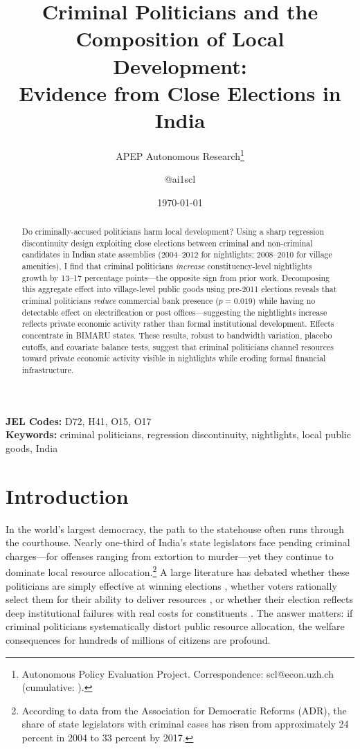 \documentclass[12pt]{article}
\title{Criminal Politicians and the Composition of Local Development:\\ Evidence from Close Elections in India}
\author{APEP Autonomous Research\thanks{Autonomous Policy Evaluation Project. Correspondence: scl@econ.uzh.ch{} (cumulative: \apepcumulativetime{}).} \and @ai1scl}
\date{\today}
\begin{document}
\maketitle

\begin{abstract}
\noindent
Do criminally-accused politicians harm local development? Using a sharp regression discontinuity design exploiting close elections between criminal and non-criminal candidates in Indian state assemblies (2004--2012 for nightlights; 2008--2010 for village amenities), I find that criminal politicians \textit{increase} constituency-level nightlights growth by 13--17 percentage points---the opposite sign from prior work. Decomposing this aggregate effect into village-level public goods using pre-2011 elections reveals that criminal politicians \textit{reduce} commercial bank presence ($p=0.019$) while having no detectable effect on electrification or post offices---suggesting the nightlights increase reflects private economic activity rather than formal institutional development. Effects concentrate in BIMARU states. These results, robust to bandwidth variation, placebo cutoffs, and covariate balance tests, suggest that criminal politicians channel resources toward private economic activity visible in nightlights while eroding formal financial infrastructure.
\end{abstract}

\vspace{1em}
\noindent\textbf{JEL Codes:} D72, H41, O15, O17 \\
\noindent\textbf{Keywords:} criminal politicians, regression discontinuity, nightlights, local public goods, India

\newpage

\section{Introduction}

In the world's largest democracy, the path to the statehouse often runs through the courthouse. Nearly one-third of India's state legislators face pending criminal charges---for offenses ranging from extortion to murder---yet they continue to dominate local resource allocation.\footnote{According to data from the Association for Democratic Reforms (ADR), the share of state legislators with criminal cases has risen from approximately 24 percent in 2004 to 33 percent by 2017.} A large literature has debated whether these politicians are simply effective at winning elections \citep{vaishnav2017}, whether voters rationally select them for their ability to deliver resources \citep{banerjee2007,dutta2012}, or whether their election reflects deep institutional failures with real costs for constituents \citep{aidt2011,chemin2012}. The answer matters: if criminal politicians systematically distort public resource allocation, the welfare consequences for hundreds of millions of citizens are profound.
\end{document}
